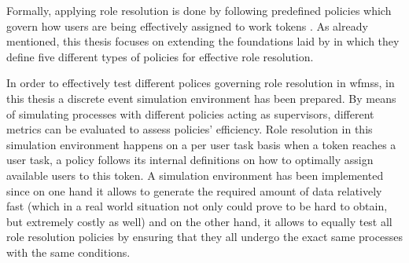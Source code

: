 Formally, applying role resolution is done by following predefined policies which govern how users are being effectively assigned to work tokens \citep{Zeng2005}. As already mentioned, this thesis focuses on extending the foundations laid by \citet{Zeng2005} in which they define five different types of policies for effective role resolution.

In order to effectively test different polices governing role resolution in \glspl{wfms}, in this thesis a discrete event simulation environment has been prepared. By means of simulating processes with different policies acting as supervisors, different metrics can be evaluated to assess policies' efficiency. Role resolution in this simulation environment happens on a per user task basis \ie when a token reaches a user task, a policy follows its internal definitions on how to optimally assign available users to this token. A simulation environment has been implemented since on one hand it allows to generate the required amount of data relatively fast (which in a real world situation not only could prove to be hard to obtain, but extremely costly as well) and on the other hand, it allows to equally test all role resolution policies by ensuring that they all undergo the exact same processes with the same conditions.